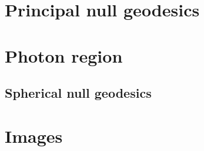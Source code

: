 \section{Principal null geodesics}

\section{Photon region}

\subsection{Spherical null geodesics}

\section{Images}
